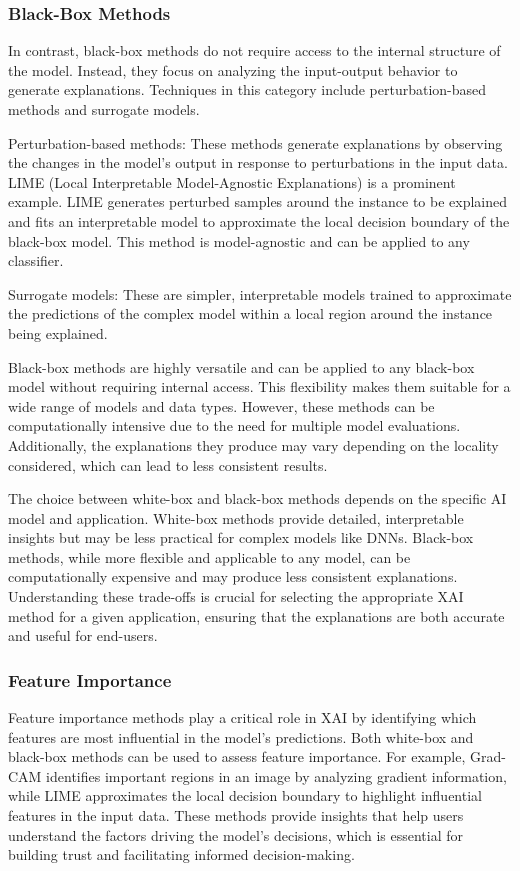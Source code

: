 \documentclass{article}
\begin{document}
\subsubsection{Black-Box Methods}
In contrast, black-box methods do not require access to the internal structure of the model. Instead, they focus on analyzing the input-output behavior to generate explanations. Techniques in this category include perturbation-based methods and surrogate models.

Perturbation-based methods: These methods generate explanations by observing the changes in the model’s output in response to perturbations in the input data. LIME (Local Interpretable Model-Agnostic Explanations) is a prominent example. LIME generates perturbed samples around the instance to be explained and fits an interpretable model to approximate the local decision boundary of the black-box model. This method is model-agnostic and can be applied to any classifier.

Surrogate models: These are simpler, interpretable models trained to approximate the predictions of the complex model within a local region around the instance being explained.

Black-box methods are highly versatile and can be applied to any black-box model without requiring internal access. This flexibility makes them suitable for a wide range of models and data types. However, these methods can be computationally intensive due to the need for multiple model evaluations. Additionally, the explanations they produce may vary depending on the locality considered, which can lead to less consistent results.

The choice between white-box and black-box methods depends on the specific AI model and application. White-box methods provide detailed, interpretable insights but may be less practical for complex models like DNNs. Black-box methods, while more flexible and applicable to any model, can be computationally expensive and may produce less consistent explanations. Understanding these trade-offs is crucial for selecting the appropriate XAI method for a given application, ensuring that the explanations are both accurate and useful for end-users.

\subsubsection{Feature Importance}
Feature importance methods play a critical role in XAI by identifying which features are most influential in the model’s predictions. Both white-box and black-box methods can be used to assess feature importance. For example, Grad-CAM identifies important regions in an image by analyzing gradient information, while LIME approximates the local decision boundary to highlight influential features in the input data. These methods provide insights that help users understand the factors driving the model’s decisions, which is essential for building trust and facilitating informed decision-making.
\end{document}
